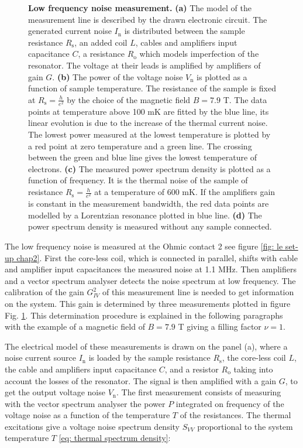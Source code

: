 \begin{figure}[hptb]
\begin{center}
\begin{tabular}{c c c c}
		\end{tabular}
	\end{center}
	
	\caption{\textbf{Low frequency noise measurement.} \textbf{(a)} The model of the measurement line is described by the drawn electronic circuit. The generated current noise $I_{\mathrm{n}}$ is distributed between the sample resistance $R_{\mathrm{s}}$, an added coil $L$, cables and amplifiers input capacitance $C$, a resistance $R_{\mathrm{o}}$ which models imperfection of the resonator. The voltage at their leads is amplified by amplifiers of gain $G$. \textbf{(b)} The power of the voltage noise $V_{\mathrm{n}}$ is plotted as a function of sample temperature. The resistance of the sample is fixed at $R_{\mathrm{s}} = \frac{h}{e^2}$ by the choice of the magnetic field $B = 7.9$ T. The data points at temperature above 100 mK are fitted by the blue line, its linear evolution is due to the increase of the thermal current noise. The lowest power measured at the lowest temperature is plotted by a red point at zero temperature and a green line. The crossing between the green and blue line gives the lowest temperature of electrons. \textbf{(c)} The measured power spectrum density is plotted as a function of frequency. It is the thermal noise of the sample of resistance $R_{\mathrm{s}} = \frac{h}{e^2}$ at a temperature of 600 mK. If the amplifiers gain is constant in the measurement bandwidth, the red data points are modelled by a Lorentzian resonance plotted in blue line. \textbf{(d)} The power spectrum density is measured without any sample connected.}
	\label{fig: low freq noise gain}
\end{figure}

The low frequency noise is measured at the Ohmic contact 2 see figure \ref{fig: le set-up chap2}.
First the core-less coil, which is connected in parallel, shifts with cable and amplifier input capacitances the measured noise at 1.1 MHz.
Then amplifiers and a vector spectrum analyser detects the noise spectrum at low frequency.
The calibration of the gain $G_{IV}^{2}$ of this measurement line is needed to get information on the system.
This gain is determined by three measurements plotted in figure Fig. \ref{fig: low freq noise gain}.
This determination procedure is explained in the following paragraphs with the example of a magnetic field of $B = 7.9$ T giving a filling factor $\nu = 1$.

The electrical model of these measurements is drawn on the panel (a), where a noise current source $I_{\mathrm{n}}$ is loaded by the sample resistance $R_{\mathrm{s}}$, the core-less coil $L$, the cable and amplifiers input capacitance $C$, and a resistor $R_{\mathrm{o}}$ taking into account the losses of the resonator.
The signal is then amplified with a gain $G$, to get the output voltage noise $V_{\mathrm{n}}$.
The first measurement consists of measuring with the vector spectrum analyser the power $P$ integrated on frequency of the voltage noise as a function of the temperature $T$ of the resistances.
The thermal excitations give a voltage noise spectrum density $S_{VV}$ proportional to the system temperature $T$ \eqref{eq: thermal spectrum density}:

